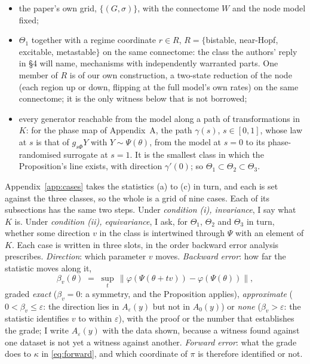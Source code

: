 \documentclass[11pt]{article}
\begin{document}
\begin{enumerate}
\begin{itemize}
  \item[$\Theta_1$] the paper's own grid, $\{(G,\sigma)\}$, with the connectome $W$ and the node model fixed;
  \item[$\Theta_2$] $\Theta_1$ together with a regime coordinate $r\in R$, $R=\{$bistable, near-Hopf, excitable, metastable$\}$ on the same connectome: the class the authors' reply in \S4 will name, mechanisms with independently warranted parts. One member of $R$ is of our own construction, a two-state reduction of the node (each region up or down, flipping at the full model's own rates) on the same connectome; it is the only witness below that is not borrowed;
  \item[$\Theta_3$] every generator reachable from the model along a path of transformations in $K$: for the phase map of Appendix~A, the path $\gamma(s)$, $s\in[0,1]$, whose law at $s$ is that of $g_{s\Phi}Y$ with $Y\sim\Psi(\theta)$, from the model at $s=0$ to its phase-randomised surrogate at $s=1$. It is the smallest class in which the Proposition's line exists, with direction $\gamma'(0)$; so $\Theta_1\subset\Theta_2\subset\Theta_3$.
  \end{itemize}
\end{enumerate}
Appendix~\ref{app:cases} takes the statistics (a) to (c) in turn, and each is set against the three classes, so the whole is a grid of nine cases. Each of its subsections has the same two steps. Under \emph{condition (i), invariance}, I say what $K$ is. Under \emph{condition (ii), equivariance}, I ask, for $\Theta_1$, $\Theta_2$ and $\Theta_3$ in turn, whether some direction $v$ in the class is intertwined through $\Psi$ with an element of $K$. Each case is written in three slots, in the order backward error analysis prescribes. \emph{Direction}: which parameter $v$ moves. \emph{Backward error}: how far the statistic moves along it,
\begin{equation}
\beta_v(\theta)\;=\;\sup_{t}\,\bigl\|\varphi(\Psi(\theta+tv))-\varphi(\Psi(\theta))\bigr\|,
\label{eq:betav}
\end{equation}
graded \emph{exact} ($\beta_v=0$: a symmetry, and the Proposition applies), \emph{approximate} ($0<\beta_v\le\varepsilon$: the direction lies in $A_\varepsilon(y)$ but not in $A_0(y)$) or \emph{none} ($\beta_v>\varepsilon$: the statistic identifies $v$ to within $\varepsilon$), with the proof or the number that establishes the grade; I write $A_\varepsilon(y)$ with the data shown, because a witness found against one dataset is not yet a witness against another. \emph{Forward error}: what the grade does to $\kappa$ in \eqref{eq:forward}, and which coordinate of $\pi$ is therefore identified or not.
\end{document}
